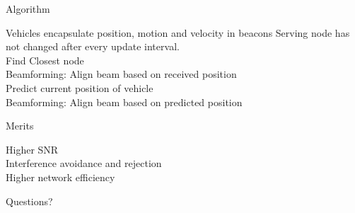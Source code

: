 \documentclass[10pt]{beamer}
\begin{document}
\begin{frame}{Algorithm}
\begin{algorithmic}
\Require Vehicles encapsulate position, motion and velocity in beacons
\Ensure Serving node has not changed after every update interval.
\\Find Closest node 
 \\Beamforming: Align beam based on received position
\Else
\\Predict current position of vehicle \\
 Beamforming: Align beam based on predicted position
 \EndIf
\EndIf
\end{algorithmic}
\end{frame}

\begin{frame}{Merits}
	\begin{description}
		\item [Higher SNR] 
		\item [Interference avoidance and rejection] 
		\item [Higher network efficiency] 
	\end{description}
\end{frame}

{
\begin{frame}[standout]
  Questions?
\end{frame}
}
\end{document}

